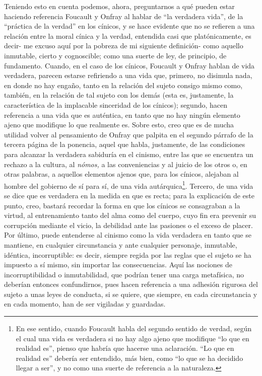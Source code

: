\begin{refsection}
Teniendo esto en cuenta podemos, ahora, preguntarnos a qué pueden estar haciendo referencia Foucault y Onfray al hablar de ``la verdadera vida'', de la ``práctica de la verdad'' en los cínicos, y se hace evidente que no se refieren a una relación entre la moral cínica y la verdad, entendida casi que platónicamente, es decir- me excuso aquí por la pobreza de mi siguiente definición- como aquello inmutable, cierto y cognoscible; como una suerte de ley, de principio, de fundamento. Cuando, en el caso de los cínicos, Foucault y Onfray hablan de vida verdadera, parecen estarse refiriendo a una vida que, primero, no disimula nada, en donde no hay engaño, tanto en la relación del sujeto consigo mismo como, también, en la relación de tal sujeto con los demás (esta es, justamente, la característica de la implacable sinceridad de los cínicos); segundo, hacen referencia a una vida que es auténtica, en tanto que no hay ningún elemento ajeno que modifique lo que realmente es. Sobre esto, creo que es de mucha utilidad volver al pensamiento de Onfray que palpita en el segundo párrafo de la tercera página de la ponencia, aquel que habla, justamente, de las condiciones para alcanzar la verdadera sabiduría en el cinismo, entre las que se encuentra un rechazo a la cultura, al \emph{nómos,} a las conveniencias y al juicio de los otros o, en otras palabras, a aquellos elementos ajenos que, para los cínicos, alejaban al hombre del gobierno de sí para sí, de una vida autárquica\footnote{En ese sentido, cuando Foucault habla del segundo sentido de verdad, según el cual una vida es verdadera si no hay algo ajeno que modifique ``lo que en realidad es'', pienso que habría que hacerse una aclaración. ``Lo que en realidad es'' debería ser entendido, más bien, como ``lo que se ha decidido llegar a ser'', y no como una suerte de referencia a la naturaleza.}. Tercero, de una vida se dice que es verdadera en la medida en que es recta; para la explicación de este punto, creo, bastará recordar la forma en que los cínicos se consagraban a la virtud, al entrenamiento tanto del alma como del cuerpo, cuyo fin era prevenir su corrupción mediante el vicio, la debilidad ante las pasiones o el exceso de placer. Por último, puede entenderse al cinismo como la vida verdadera en tanto que se mantiene, en cualquier circunstancia y ante cualquier personaje, inmutable, idéntica, incorruptible: es decir, siempre regida por las reglas que el sujeto se ha impuesto a sí mismo, sin importar las consecuencias. Aquí las nociones de incorruptibilidad o inmutabilidad, que podrían tener una carga metafísica, no deberían entonces confundirnos, pues hacen referencia a una adhesión rigurosa del sujeto a unas leyes de conducta, si se quiere, que siempre, en cada circunstancia y en cada momento, han de ser vigiladas y guardadas.


\end{refsection}
